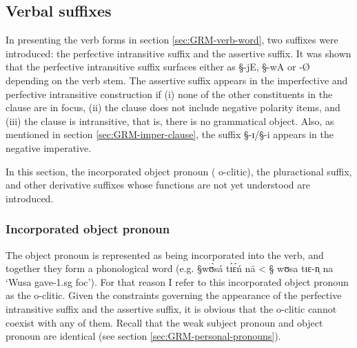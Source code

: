







\subsection{Verbal suffixes}
\label{sec:GRM-verb-suffix}


In presenting the verb forms in section \ref{sec:GRM-verb-word}, two suffixes
were introduced: the perfective intransitive suffix and the assertive suffix. It
was shown that the perfective intransitive suffix surfaces either as {\S -jE},
{\S -wA} or {-\O} depending on  the verb stem.  The assertive suffix
appears  in the imperfective and perfective  intransitive construction if  (i)
none of the other constituents in the clause are in focus, (ii) the clause does
not include negative polarity items, and (iii) the clause is intransitive, that
is, there is no grammatical object. Also,  as mentioned in section
\ref{sec:GRM-imper-clause},  the suffix {\S -ɪ}/{\S -i} appears in the negative
imperative. 

In this section,  the incorporated object pronoun  ({\sc
o}-clitic), the pluractional  suffix, and  other derivative suffixes whose
functions are not yet understood are introduced.


\subsubsection{Incorporated object pronoun}
\label{sec:GRM-morph-opro}


The object pronoun  is represented as being incorporated into the verb,  and 
together they form a phonological word (e.g.  {\S wʊ̀sá tɪ́ɛ́ń nā} < {\S
wʊsa tɪɛ-n̩ na}  `Wusa gave-{\sc 1.sg} {\sc foc}').  For that reason I refer to
this incorporated object pronoun as the {\sc o}-clitic. Given the constraints
governing the appearance of the perfective intransitive suffix and the assertive
suffix, it is obvious that the {\sc o}-clitic cannot coexist with any of them.
Recall that the  weak subject pronoun and object  pronoun are identical (see
section \ref{sec:GRM-personal-pronouns}).



